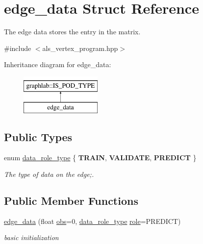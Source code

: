 \hypertarget{structedge__data}{\section{edge\-\_\-data Struct Reference}
\label{structedge__data}
}


The edge data stores the entry in the matrix.  




{\ttfamily \#include $<$als\-\_\-vertex\-\_\-program.\-hpp$>$}

Inheritance diagram for edge\-\_\-data\-:\begin{figure}[H]
\begin{center}
\leavevmode
\includegraphics[height=2.000000cm]{structedge__data}
\end{center}
\end{figure}
\subsection*{Public Types}
\begin{DoxyCompactItemize}
\item 
enum \hyperlink{structedge__data_a058121c45cac9d350dd70939a023b55d}{data\-\_\-role\-\_\-type} \{ {\bfseries T\-R\-A\-I\-N}, 
{\bfseries V\-A\-L\-I\-D\-A\-T\-E}, 
{\bfseries P\-R\-E\-D\-I\-C\-T}
 \}
\begin{DoxyCompactList}\small\item\em The type of data on the edge;. \end{DoxyCompactList}\end{DoxyCompactItemize}
\subsection*{Public Member Functions}
\begin{DoxyCompactItemize}
\item 
\hypertarget{structedge__data_a98967d7ad71e7ef996e6b9727e97949c}{\hyperlink{structedge__data_a98967d7ad71e7ef996e6b9727e97949c}{edge\-\_\-data} (float \hyperlink{structedge__data_a1fc50f971f9fdbb4c9c90e33bda1c758}{obs}=0, \hyperlink{structedge__data_a058121c45cac9d350dd70939a023b55d}{data\-\_\-role\-\_\-type} \hyperlink{structedge__data_a3fbba49eb9690a4fdeeda275d6c9cad9}{role}=P\-R\-E\-D\-I\-C\-T)}\label{structedge__data_a98967d7ad71e7ef996e6b9727e97949c}

\begin{DoxyCompactList}\small\item\em basic initialization \end{DoxyCompactList}\end{DoxyCompactItemize}
